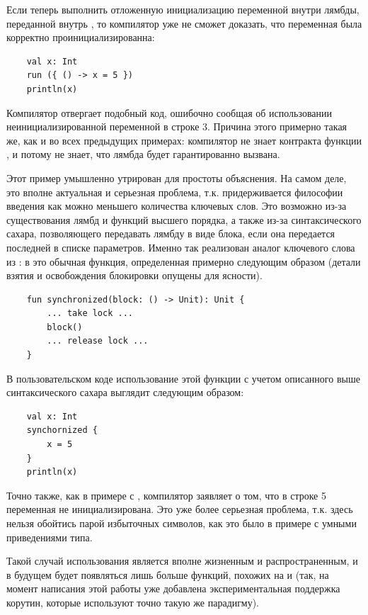 Если теперь выполнить отложенную инициализацию переменной внутри лямбды, переданной внутрь , то компилятор уже не сможет доказать, что переменная была корректно проинициализированна:

\begin{verbatim}
    val x: Int
    run ({ () -> x = 5 })
    println(x)
\end{verbatim}

Компилятор отвергает подобный код, ошибочно сообщая об использовании неинициализированной переменной в строке 3. Причина этого примерно такая же, как и во всех предыдущих примерах: компилятор не знает контракта функции , и потому не знает, что лямбда  будет гарантированно вызвана.

Этот пример умышленно утрирован для простоты объяснения. На самом деле, это вполне актуальная и серьезная проблема, т.к.  придерживается философии введения как можно меньшего количества ключевых слов. Это возможно из-за существования лямбд и функций высшего порядка, а также из-за синтаксического сахара, позволяющего передавать лямбду в виде блока, если она передается последней в списке параметров. Именно так реализован аналог ключевого слова  из : в  это обычная функция, определенная примерно следующим образом (детали взятия и освобождения блокировки опущены для ясности).

\begin{verbatim}
    fun synchronized(block: () -> Unit): Unit {
        ... take lock ...
        block()
        ... release lock ...
    }
\end{verbatim}

В пользовательском коде использование этой функции с учетом описанного выше синтаксического сахара выглядит следующим образом:

\begin{verbatim}
    val x: Int
    synchornized {
        x = 5
    }
    println(x)
\end{verbatim}

Точно также, как в примере с , компилятор заявляет о том, что в строке 5 переменная  не инициализирована. Это уже более серьезная проблема, т.к. здесь нельзя обойтись парой избыточных символов, как это было в примере с умными приведениями типа. 

Такой случай использования является вполне жизненным и распространенным, и в будущем будет появляться лишь больше функций, похожих на  и  (так, на момент написания этой работы уже добавлена экспериментальная поддержка корутин, которые используют точно такую же парадигму).

